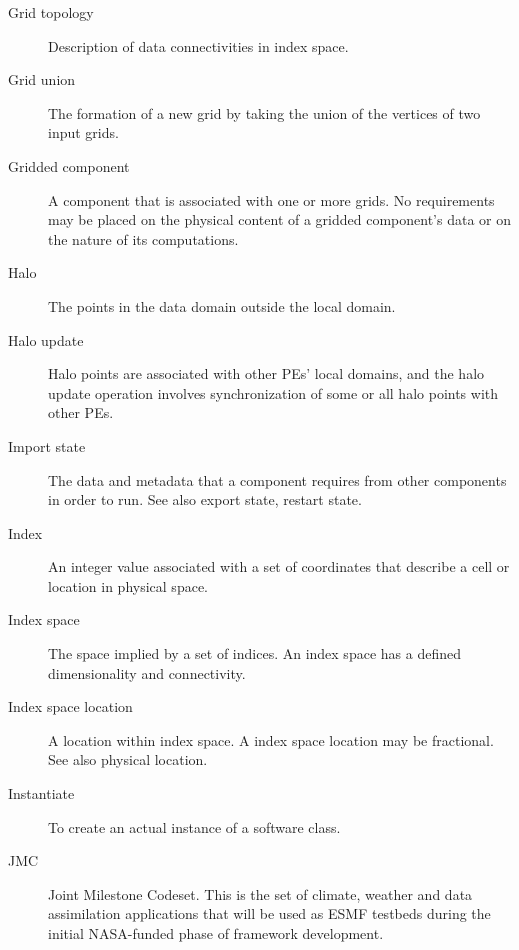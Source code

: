 \begin{description}
\item[Grid topology] \label{glos:GridTopo} Description of data 
  connectivities in index space.

\item[Grid union] \label{glos:GridUnion} The formation of a new grid
  by taking the union of the vertices of two input grids. 

\item[Gridded component] \label{glos:GridComp}
  A component that is associated with one or more grids.  No requirements 
  may be placed on the physical content of a gridded component's data or 
  on the nature of its computations. 

\item[Halo] \label{glos:Halo} 
  The points in the data domain outside the local domain. 

\item[Halo update] \label{glos:HaloUpdate}
  Halo points are associated with other PEs'
  local domains, and the halo update operation involves
  synchronization of some or all halo points with other PEs. 

\item[Import state] \label{glos:ImportState} The data and metadata 
  that a component requires from other components in order to run.  
  See also export state, restart state.

\item[Index] \label{glos:Index} An integer value associated with a set
  of coordinates that describe a cell or location in physical space.

\item[Index space] \label{glos:IndexSpace} The space implied 
  by a set of indices.  An index space has a defined dimensionality and 
  connectivity.

\item[Index space location] \label{glos:IndexSpaceloc} 
  A location within index space.  A index space location may be fractional.
  See also physical location.

\item[Instantiate] \label{glos:Instantiate}
  To create an actual instance of a software class.

\item[JMC] \label{glos:JMC} 
  Joint Milestone Codeset.  This is the set of climate, weather and
  data assimilation applications that will be used as ESMF testbeds 
  during the initial NASA-funded phase of framework development.


\end{description}
